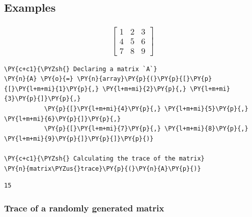     \hypertarget{examples}{%
\subsection{Examples}\label{examples}}

    \hypertarget{beginbmatrix-1-2-3-4-5-6-7-8-9-endbmatrix}{%
\subsubsection{\texorpdfstring{\[\begin{bmatrix} 1 & 2 & 3 \\ 4 & 5 & 6 \\ 7 & 8 & 9 \end{bmatrix}\]}{\textbackslash begin\{bmatrix\} 1 \& 2 \& 3 \textbackslash\textbackslash{} 4 \& 5 \& 6 \textbackslash\textbackslash{} 7 \& 8 \& 9 \textbackslash end\{bmatrix\}}}\label{beginbmatrix-1-2-3-4-5-6-7-8-9-endbmatrix}}

    \begin{tcolorbox}[breakable, size=fbox, boxrule=1pt, pad at break*=1mm,colback=cellbackground, colframe=cellborder]
\begin{Verbatim}[commandchars=\\\{\}]
\PY{c+c1}{\PYZsh{} Declaring a matrix `A`}
\PY{n}{A} \PY{o}{=} \PY{n}{array}\PY{p}{(}\PY{p}{[}\PY{p}{[}\PY{l+m+mi}{1}\PY{p}{,} \PY{l+m+mi}{2}\PY{p}{,} \PY{l+m+mi}{3}\PY{p}{]}\PY{p}{,}
           \PY{p}{[}\PY{l+m+mi}{4}\PY{p}{,} \PY{l+m+mi}{5}\PY{p}{,} \PY{l+m+mi}{6}\PY{p}{]}\PY{p}{,}
           \PY{p}{[}\PY{l+m+mi}{7}\PY{p}{,} \PY{l+m+mi}{8}\PY{p}{,} \PY{l+m+mi}{9}\PY{p}{]}\PY{p}{]}\PY{p}{)}

\PY{c+c1}{\PYZsh{} Calculating the trace of the matrix}
\PY{n}{matrix\PYZus{}trace}\PY{p}{(}\PY{n}{A}\PY{p}{)}
\end{Verbatim}
\end{tcolorbox}

            \begin{tcolorbox}[breakable, size=fbox, boxrule=.5pt, pad at break*=1mm, opacityfill=0]
\begin{Verbatim}[commandchars=\\\{\}]
15
\end{Verbatim}
\end{tcolorbox}
        
    \hypertarget{trace-of-a-randomly-generated-matrix}{%
\subsubsection{Trace of a randomly generated
matrix}\label{trace-of-a-randomly-generated-matrix}}

